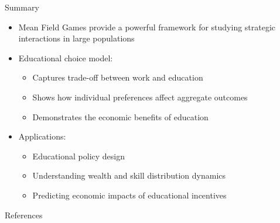 \documentclass{beamer}
\begin{document}
\begin{frame}{Summary}
\begin{itemize}
    \item Mean Field Games provide a powerful framework for studying strategic interactions in large populations
    \item Educational choice model:
    \begin{itemize}
        \item Captures trade-off between work and education
        \item Shows how individual preferences affect aggregate outcomes
        \item Demonstrates the economic benefits of education
    \end{itemize}
    \item Applications:
    \begin{itemize}
        \item Educational policy design
        \item Understanding wealth and skill distribution dynamics
        \item Predicting economic impacts of educational incentives
    \end{itemize}
\end{itemize}
\end{frame}

\begin{frame}{References}
\printbibliography
\end{frame}
\end{document}
